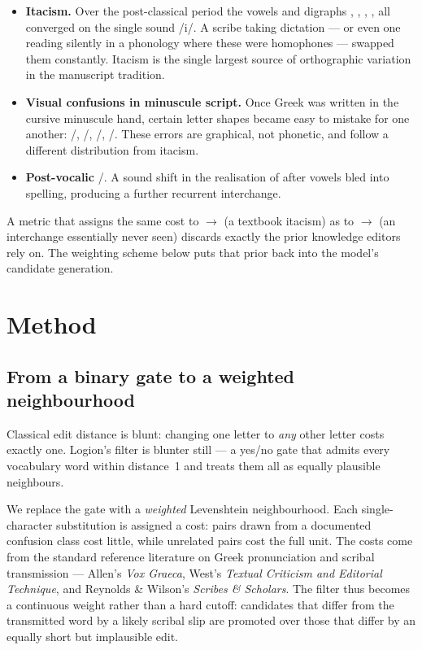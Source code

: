 \documentclass[11pt]{article}
\newcommand{\itac}{\texteta, \textiota, \textupsilon, \textepsilon\textiota, \textomicron\textiota}
\newcommand{\visconf}{\textgamma/\texttau, \textlambda/\textmu, \textbeta/\textnu, \textrho/\textpi}
\newcommand{\postvoc}{\textbeta/\textupsilon}
\begin{document}
\begin{itemize}
  \item \textbf{Itacism.} Over the post-classical period the vowels and digraphs
  \itac{} all converged on the single sound /i/. A scribe taking dictation --- or
  even one reading silently in a phonology where these were homophones --- swapped
  them constantly. Itacism is the single largest source of orthographic variation
  in the manuscript tradition.
  \item \textbf{Visual confusions in minuscule script.} Once Greek was written in
  the cursive minuscule hand, certain letter shapes became easy to mistake for one
  another: \visconf{}. These errors are graphical, not phonetic, and follow a
  different distribution from itacism.
  \item \textbf{Post-vocalic} \postvoc{}. A sound shift in the realisation of
  \textbeta{} after vowels bled into spelling, producing a further recurrent
  interchange.
\end{itemize}

A metric that assigns the same cost to \texteta${\to}$\textiota{} (a textbook
itacism) as to \texteta${\to}$\textxi{} (an interchange essentially never seen)
discards exactly the prior knowledge editors rely on. The weighting scheme
below puts that prior back into the model's candidate generation.

\section{Method}

\subsection{From a binary gate to a weighted neighbourhood}

Classical edit distance is blunt: changing one letter to \emph{any} other letter
costs exactly one. Logion's filter is blunter still --- a yes/no gate that
admits every vocabulary word within distance~1 and treats them all as equally
plausible neighbours.

We replace the gate with a \emph{weighted} Levenshtein neighbourhood. Each
single-character substitution is assigned a cost: pairs drawn from a
documented confusion class cost little, while unrelated pairs cost the full unit.
The costs come from the standard reference literature on Greek
pronunciation and scribal transmission --- Allen's \emph{Vox Graeca}, West's
\emph{Textual Criticism and Editorial Technique}, and Reynolds \& Wilson's
\emph{Scribes \& Scholars}. The filter thus becomes a continuous
weight rather than a hard cutoff: candidates that differ from the transmitted word
by a likely scribal slip are promoted over those that differ by an
equally short but implausible edit.
\end{document}
